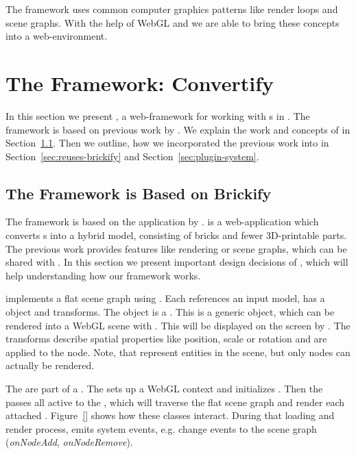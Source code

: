 \documentclass[../ClassicThesis.tex]{subfiles}
\begin{document}
The framework {\convertify} uses common computer graphics
patterns like render loops and scene graphs. With the help
of WebGL and {\threejs} we are able to bring these concepts
into a web-environment.

\section{The Framework: Convertify}
\label{sec:framework-convertify}

In this section we present {\convertify}, a web-framework for working
with {\threedmodel}s in {\threejs}. The framework is based on
previous work by \citeauthor{brickify-thesis}. We explain the work and
concepts of \citeauthor{brickify-thesis} in
Section~\ref{sec:based-brickify}. Then we outline, how we incorporated
the previous work into {\convertify} in
Section~\ref{sec:reuses-brickify} and Section~\ref{sec:plugin-system}.

\subsection{The Framework is Based on Brickify}
\label{sec:based-brickify}

The framework {\convertify} is based on the application {\brickify}
by \citeauthor{brickify-thesis}. {\brickify} is a web-application
which converts {\threedmodel}s into a hybrid model, consisting of
{\lego} bricks and fewer 3D-printable parts. The previous work
provides features like rendering or scene graphs, which can be
shared with {\convertify}. In this section we present important
design decisions of {\brickify}, which will help understanding how
our framework
works.

{\brickify} implements a flat scene graph using . Each
 references an input model, has a {\threejs} object and
transforms. The {\threejs} object is a . This
is a generic object, which can be rendered into a WebGL scene with
{\threejs}. This  will be displayed on the
screen by {\brickify}. The transforms describe spatial properties
like position, scale or rotation and are applied to the {\threejs}
node. Note, that  represent entities in the scene, but
only {\threejs} nodes can actually be rendered.

The  are part of a . The 
sets up a WebGL context and initializes {\threejs}. Then the
 passes all active  to the
, which will traverse the flat scene graph and
render each attached .
Figure~\ref{} shows how these classes interact.
During that loading and render process, {\brickify} emits system
events, e.g. change events to the scene graph (\textit{onNodeAdd},
\textit{onNodeRemove}).
\end{document}
